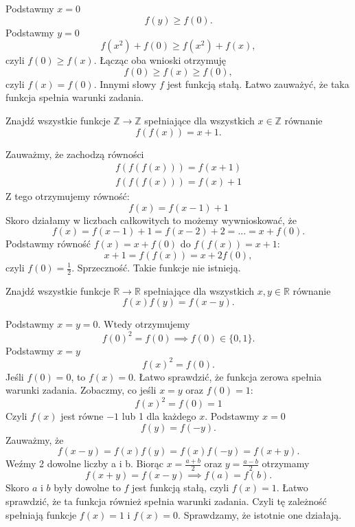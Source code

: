 \noindent
Podstawmy $x = 0$
\[ 
	f(y) \geqslant f(0). 
\] 
Podstawmy $y = 0$ 
\[ 
	f(x^2) + f(0) \geqslant f(x^2) + f(x), 
\] 
czyli $f(0) \geqslant f(x) $. 
Łącząc oba wnioski otrzymuję 
\[ 
	f(0) \geqslant f(x) \geqslant f(0), 
\] 
czyli $f(x) = f(0)$. Innymi słowy $f$ jest funkcją stałą. Łatwo zauważyć, że taka funkcja spełnia warunki zadania. 

\vspace{5px}

\begin{problem}{8}
	Znajdź wszystkie funkcje $\mathbb{Z} \rightarrow \mathbb{Z} $ spełniające dla wszystkich $x \in \mathbb{Z} $ równanie
	\[
		 f(f(x)) =x+1.
	\] 
\end{problem}


\noindent
Zauważmy, że zachodzą równości 
\begin{gather*} 
f(f(f(x))) = f(x + 1) \\
f(f(f(x))) = f(x) +1 
\end{gather*} 
Z tego otrzymujemy równość: 
\[
	f(x) =f(x-1)+1 
\] 
Skoro działamy w liczbach całkowitych to możemy wywnioskować, że
\[
	f(x) = f(x - 1) + 1 = f(x - 2) +  2 =  ... = x + f(0).
\] 
Podstawmy równość $f(x) = x + f(0)$ do 
$f(f(x)) = x + 1$:
\[
	x + 1 = f(f(x))= x + 2f(0), 
\]
czyli $f(0) = \frac{1}{2}$. Sprzeczność. Takie funkcje nie istnieją.

\vspace{5px} 

\begin{problem}{9}
	Znajdź wszystkie funkcje $\mathbb{R} \rightarrow \mathbb{R} $ spełniające dla wszystkich $x, y \in \mathbb{R} $ równanie 
	\[
		f(x) f(y) = f(x-y).
	\] 
\end{problem}


\noindent
Podstawmy $x = y = 0$. Wtedy otrzymujemy 
\[
	f(0)^{2} = f(0) \implies f(0) \in \{0, 1\}.
\]
Podstawmy $x = y$
\[
	f(x)^{2} = f(0).
\] 
Jeśli $f(0)=0$, to $f(x) =0$. Łatwo sprawdzić, że funkcja zerowa spełnia warunki zadania.
Zobaczmy, co jeśli $x = y$ oraz $f(0) = 1$:
\[
	f(x)^{2} = f(0) = 1 
\] 
Czyli $f(x)$ jest równe $-1$ lub 1 dla każdego $x$.
Podstawmy $x=0$
\[
	f(y) =f(-y).
\] 
Zauważmy, że 
\[
	f(x - y) = f(x)f(y) = f(x)f(-y) = f(x+y). 
\] 
Weźmy 2 dowolne liczby a i b. Biorąc $x=\frac{a+b}{2}$ oraz 
$y=\frac{a-b}{2}$ otrzymamy
\[
	f(x+y) = f(x-y) \implies f(a) = f(b).
\] 
Skoro $a$ i $b$ były dowolne to $f$ jest funkcją stałą, czyli $f(x) = 1$. Łatwo sprawdzić, że ta funkcja również spełnia warunki zadania. Czyli tę zależność spełniają funkcje $f(x) = 1 $ i $f(x) = 0$. Sprawdzamy, że istotnie one działają.

